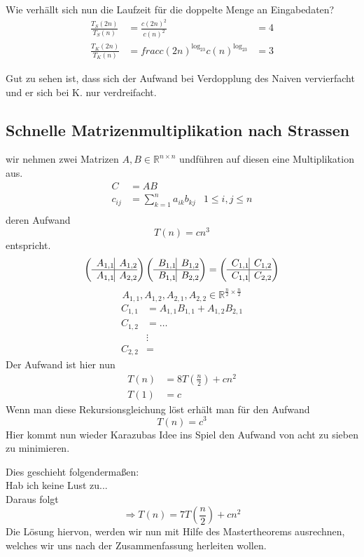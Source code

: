 Wie verhällt sich nun die Laufzeit für die doppelte Menge an Eingabedaten?
\begin{align*}
\frac{T_S(2n)}{T_S(n)}&=\frac{c(2n)^2}{c(n)^2}&=4\\
\frac{T_K(2n)}{T_K(n)}&=frac{c(2n)^{\log_23}}{c(n)^{\log_23}}&=3
\end{align*}

Gut zu sehen ist, dass sich der Aufwand bei Verdopplung des Naiven vervierfacht und er sich bei K. nur verdreifacht.
\subsection{Schnelle Matrizenmultiplikation nach Strassen}

wir nehmen zwei Matrizen $A,B\in \mathbb R^{n\times n}$ und\linebreak führen auf diesen eine Multiplikation aus.
\begin{align*}C&=AB\\
c_{ij}&=\sum_{k=1}^na_{ik}b_{kj} &1\le i,j \le n\\
\end{align*}
deren Aufwand
$$T(n)=cn^3$$
entspricht.
\[\left(\begin{array}{c@{ }|c@{ }}
A_{1,1} & A_{1,2} \\\hline
A_{1,1} &A_{2,2}
\end{array}\right)\left(\begin{array}{c@{ }|c@{ }}
B_{1,1} & B_{1,2} \\\hline
B_{1,1} &B_{2,2}
\end{array}\right)=\left(\begin{array}{c@{ }|c@{ }}
C_{1,1} & C_{1,2} \\\hline
C_{1,1} &C_{2,2}
\end{array}\right)\]
$$A_{1,1},A_{1,2},A_{2,1},A_{2,2}\in \mathbb R^{\frac{n}{2}\times\frac{n}{2}}$$
\begin{align*}
C_{1,1}&=A_{1,1}B_{1,1}+A_{1,2}B_{2,1}\\
C_{1,2}&=\ldots\\
&\vdots\\
C_{2,2}&=
\end{align*}
Der Aufwand ist hier nun
\begin{align*}T(n)&=8T\left(\frac{n}{2}\right)+cn^2\\
T(1)&=c
\end{align*}
Wenn man diese Rekursionsgleichung löst erhält man für den Aufwand $$T(n)=c^3$$
Hier kommt nun wieder Karazubas Idee ins Spiel den Aufwand von acht zu sieben zu minimieren.

Dies geschieht folgendermaßen:\\
Hab ich keine Lust zu...\\
Daraus folgt
$$\Rightarrow T(n)=7T\left(\frac{n}{2}\right)+cn^2$$
Die Lösung hiervon, werden wir nun mit Hilfe des Mastertheorems ausrechnen, welches wir uns nach der Zusammenfassung herleiten wollen.